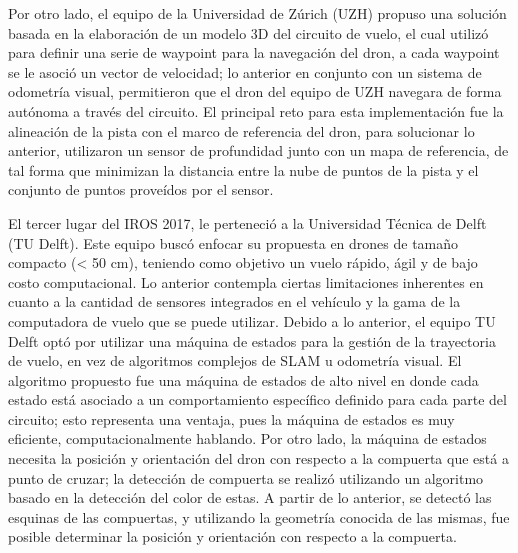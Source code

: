 Por otro lado, el equipo de la Universidad de Zúrich (UZH) propuso una solución basada en la elaboración de un modelo 3D del circuito de vuelo, el cual utilizó para definir una serie de waypoint para la navegación del dron, a cada waypoint se le asoció un vector de velocidad; lo anterior en conjunto con un sistema de odometría visual, permitieron que el dron del equipo de UZH navegara de forma autónoma a través del circuito. 
El principal reto para esta implementación fue la alineación de la pista con el marco de referencia del dron, para solucionar lo anterior, utilizaron  un sensor de profundidad junto con un mapa de referencia, de tal forma que minimizan la distancia entre la nube de puntos de la pista y el conjunto de puntos proveídos por el sensor.

El tercer lugar del IROS 2017, le perteneció a la Universidad Técnica de Delft (TU Delft). Este equipo buscó enfocar su propuesta en drones de tamaño compacto (< 50 cm), teniendo como objetivo un vuelo rápido, ágil y de bajo costo computacional. Lo anterior contempla ciertas limitaciones inherentes en cuanto a la cantidad de sensores integrados en el vehículo y la gama de la computadora de vuelo que se puede utilizar.
Debido a lo anterior, el equipo TU Delft optó por utilizar una máquina de estados para la gestión de la trayectoria de vuelo, en vez de algoritmos complejos de SLAM u odometría visual. El algoritmo propuesto fue una máquina de estados de alto nivel en donde cada estado está asociado a un comportamiento específico definido para cada parte del circuito; esto representa una ventaja, pues la máquina de estados es muy eficiente, computacionalmente hablando. 
Por otro lado, la máquina de estados necesita la posición y orientación del dron con respecto a la compuerta que está a punto de cruzar; la detección de compuerta se realizó utilizando un algoritmo basado en la detección del color de estas. A partir de lo anterior, se detectó las esquinas de las compuertas, y utilizando la geometría conocida de las mismas, fue posible determinar la posición y orientación con respecto a la compuerta.

